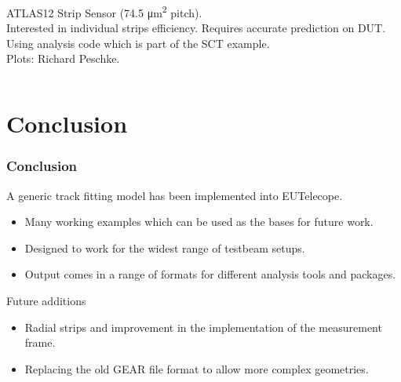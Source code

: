\documentclass{beamer}
\begin{document}
\begin{frame}
\begin{columns}[t]
\tiny{
\vspace{10pt}
ATLAS12 Strip Sensor (74.5 \si{\micro\metre\squared} pitch). \\
\vspace{10pt}
Interested in individual strips efficiency. Requires accurate prediction on DUT.\\
\vspace{10pt}
Using analysis code which is part of the SCT example.\\
\vspace{10pt}
Plots: Richard Peschke.
}
\end{columns}
\end{frame}

\section{Conclusion}
\begin{frame}
\frametitle{Conclusion}
A generic track fitting model has been implemented into EUTelecope.
\begin{itemize}
\item Many working examples which can be used as the bases for future work.
\item Designed to work for the widest range of testbeam setups.
\item Output comes in a range of formats for different analysis tools and packages. 
\end{itemize}
Future additions
\begin{itemize}
\item Radial strips and improvement in the implementation of the measurement frame.
\item Replacing the old GEAR file format to allow more complex geometries.
\end{itemize}
\end{frame}
\end{document}
